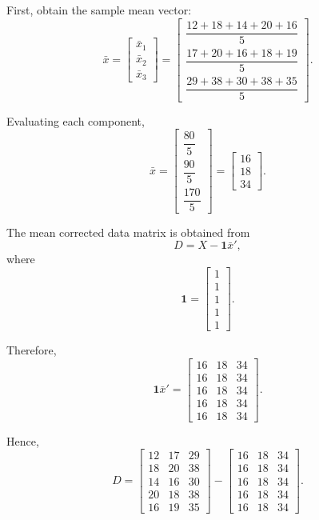 \documentclass[12pt]{article}
\begin{document}
	First, obtain the sample mean vector:
	\[
	\bar{x}
	=
	\begin{bmatrix}
		\bar{x}_1\\
		\bar{x}_2\\
		\bar{x}_3
	\end{bmatrix}
	=
	\begin{bmatrix}
		\dfrac{12+18+14+20+16}{5}\\[8pt]
		\dfrac{17+20+16+18+19}{5}\\[8pt]
		\dfrac{29+38+30+38+35}{5}
	\end{bmatrix}.
	\]
	
	Evaluating each component,
	\[
	\bar{x}
	=
	\begin{bmatrix}
		\dfrac{80}{5}\\[4pt]
		\dfrac{90}{5}\\[4pt]
		\dfrac{170}{5}
	\end{bmatrix}
	=
	\boxed{
		\begin{bmatrix}
			16\\
			18\\
			34
	\end{bmatrix}}.
	\]
	
	The mean corrected data matrix is obtained from
	\[
	D=X-\mathbf{1}\bar{x}',
	\]
	where
	\[
	\mathbf{1}
	=
	\begin{bmatrix}
		1\\1\\1\\1\\1
	\end{bmatrix}.
	\]
	
	Therefore,
	\[
	\mathbf{1}\bar{x}'
	=
	\begin{bmatrix}
		16&18&34\\
		16&18&34\\
		16&18&34\\
		16&18&34\\
		16&18&34
	\end{bmatrix}.
	\]
	
	Hence,
	\[
	D
	=
	\begin{bmatrix}
		12&17&29\\
		18&20&38\\
		14&16&30\\
		20&18&38\\
		16&19&35
	\end{bmatrix}
	-
	\begin{bmatrix}
		16&18&34\\
		16&18&34\\
		16&18&34\\
		16&18&34\\
		16&18&34
	\end{bmatrix}.
	\]
	
\end{document}
